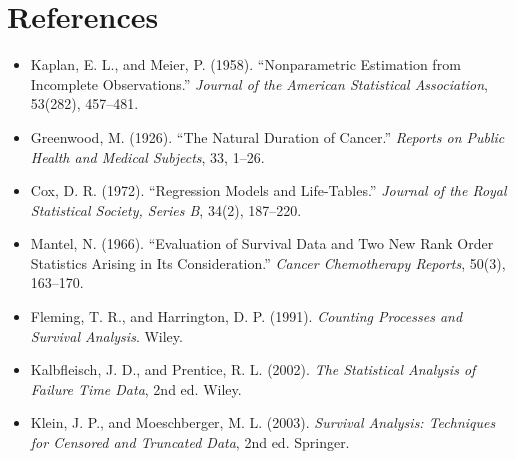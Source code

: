 \documentclass[11pt]{article}
\theoremstyle{remark}
\theoremstyle{definition}
\begin{document}
\section*{References}
\begin{itemize}
\item Kaplan, E. L., and Meier, P. (1958). ``Nonparametric Estimation from Incomplete Observations.'' \textit{Journal of the American Statistical Association}, 53(282), 457--481.
\item Greenwood, M. (1926). ``The Natural Duration of Cancer.'' \textit{Reports on Public Health and Medical Subjects}, 33, 1--26.
\item Cox, D. R. (1972). ``Regression Models and Life-Tables.'' \textit{Journal of the Royal Statistical Society, Series B}, 34(2), 187--220.
\item Mantel, N. (1966). ``Evaluation of Survival Data and Two New Rank Order Statistics Arising in Its Consideration.'' \textit{Cancer Chemotherapy Reports}, 50(3), 163--170.
\item Fleming, T. R., and Harrington, D. P. (1991). \textit{Counting Processes and Survival Analysis}. Wiley.
\item Kalbfleisch, J. D., and Prentice, R. L. (2002). \textit{The Statistical Analysis of Failure Time Data}, 2nd ed. Wiley.
\item Klein, J. P., and Moeschberger, M. L. (2003). \textit{Survival Analysis: Techniques for Censored and Truncated Data}, 2nd ed. Springer.
\end{itemize}
\end{document}
